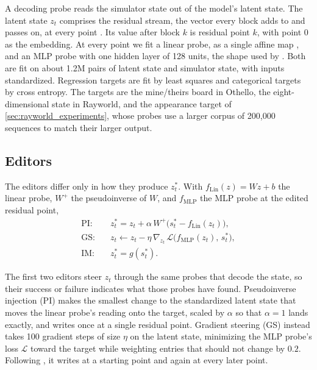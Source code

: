 \documentclass{article} %
\begin{document}
A decoding probe reads the simulator state out of the model's latent state. The latent state $z_t$ comprises the residual stream, the vector every block adds to and passes on, at every point \citep{elhage2021mathematical}. Its value after block $k$ is residual point $k$, with point 0 as the embedding. At every point we fit a linear probe, as a single affine map \citep{alain2017probes}, and an MLP probe with one hidden layer of 128 units, the shape used by \citet{li2023othello}. Both are fit on about 1.2M pairs of latent state and simulator state, with inputs standardized. Regression targets are fit by least squares and categorical targets by cross entropy. The targets are the mine/theirs board in Othello, the eight-dimensional state in Rayworld, and the appearance target of \cref{sec:rayworld_experiments}, whose probes use a larger corpus of 200,000 sequences to match their larger output.

\subsection{Editors}

The editors differ only in how they produce $z_t^*$. With $f_{\mathrm{Lin}}(z) = Wz + b$ the linear probe, $W^{+}$ the pseudoinverse of $W$, and $f_{\mathrm{MLP}}$ the MLP probe at the edited residual point,
\begin{align}
\text{PI:}\quad & z_t^* = z_t + \alpha\, W^{+}\big(s_t^* - f_{\mathrm{Lin}}(z_t)\big), \\
\text{GS:}\quad & z_t \leftarrow z_t - \eta\, \nabla_{z_t}\, \mathcal{L}\big(f_{\mathrm{MLP}}(z_t),\, s_t^*\big), \\
\text{IM:}\quad & z_t^* = g(s_t^*).
\end{align}

The first two editors steer $z_t$ through the same probes that decode the state, so their success or failure indicates what those probes have found. Pseudoinverse injection (PI) makes the smallest change to the standardized latent state that moves the linear probe's reading onto the target, scaled by $\alpha$ so that $\alpha = 1$ lands exactly, and writes once at a single residual point. Gradient steering (GS) instead takes 100 gradient steps of size $\eta$ on the latent state, minimizing the MLP probe's loss $\mathcal{L}$ toward the target while weighting entries that should not change by $0.2$. Following \citet{li2023othello}, it writes at a starting point and again at every later point.

\end{document}
